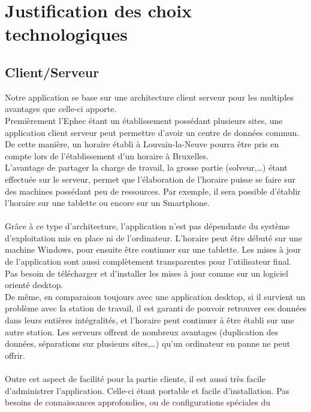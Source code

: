 
\chapter{Justification des choix technologiques}

\section{Client/Serveur}
Notre application se base sur une architecture client serveur pour les multiples
avantages que celle-ci apporte.\\
Premièrement l'Ephec étant un établissement possédant plusieurs sites,
 une application client serveur peut permettre d'avoir un centre de données
 commun.
 De cette manière, un horaire établi à Louvain-la-Neuve pourra être pris en
 compte lors de l'établissement d'un horaire à Bruxelles.\\
L'avantage de partager la charge de travail, la grosse partie (solveur,…) étant
effectuée sur le serveur, permet que l'élaboration de l'horaire puisse se
faire sur des machines possédant peu de ressources. Par exemple, il sera
possible d'établir l'horaire sur une tablette ou encore sur un Smartphone.\\
\\
Grâce à ce type d'architecture, l'application n'est pas dépendante du système
d'exploitation mis en place ni de l'ordinateur. L'horaire peut être débuté sur
une machine Windows, pour ensuite être continuer sur une tablette.
Les mises à jour de l'application sont aussi complètement transparentes pour
l'utilisateur final. Pas besoin de télécharger et d'installer les mises à jour
comme sur un logiciel orienté desktop.\\
De même, en comparaison toujours avec une application desktop, si il survient un
problème avec la station de travail, il est garanti de pouvoir retrouver ces
données dans leurs entières intégralités, et l'horaire peut continuer à être établi
sur une autre station. Les serveurs offrent de nombreux avantages (duplication des
données, séparations sur plusieurs sites,…) qu'un ordinateur en panne ne peut offrir.\\
\\
Outre cet aspect de facilité pour la partie cliente, il est aussi très facile
d'administrer l'application. Celle-ci étant portable et facile d'installation.
Pas besoins de connaissances approfondies, ou de configurations spéciales du
